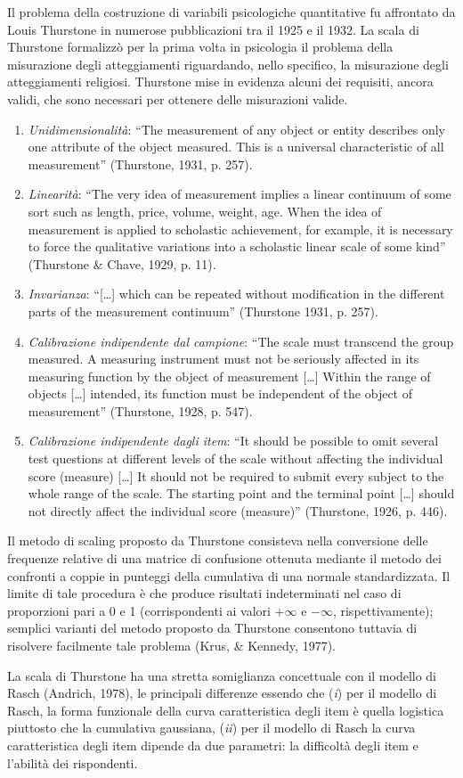 Il problema della costruzione di variabili psicologiche quantitative fu affrontato da Louis Thurstone in numerose pubblicazioni tra il 1925 e il 1932. La scala di Thurstone formalizzò per la prima volta in psicologia il problema della misurazione degli atteggiamenti riguardando, nello specifico, la misurazione degli atteggiamenti religiosi. Thurstone mise in evidenza alcuni dei requisiti, ancora validi, che sono necessari per ottenere delle misurazioni valide.
\begin{enumerate}
 \item \emph{Unidimensionalità}: ``The measurement of any object or entity describes only one attribute of the object measured. This is a universal characteristic of all measurement'' (Thurstone, 1931, p. 257). 
 \item \emph{Linearità}: ``The very idea of measurement implies a linear continuum of some sort such as length, price, volume, weight, age. When the idea of measurement is applied to scholastic achievement, for example, it is necessary to force the qualitative variations into a scholastic linear scale of some kind'' (Thurstone \& Chave, 1929, p. 11). 
 \item \emph{Invarianza}:  ``[\dots] which can be repeated without modification in the different parts of the measurement continuum'' (Thurstone 1931, p. 257).
 \item \emph{Calibrazione indipendente dal campione}: ``The scale must transcend the group measured. A measuring instrument must not be seriously affected in its measuring function by the object of measurement [\dots] Within the range of objects [\dots] intended, its function must be independent of the object of measurement'' (Thurstone, 1928, p. 547).
 \item \emph{Calibrazione indipendente dagli item}: ``It should be possible to omit several test questions at different levels of the scale without affecting the individual score (measure) [\dots] It should not be required to submit every subject to the whole range of the scale. The starting point and the terminal point [\dots] should not directly affect the individual score (measure)'' (Thurstone, 1926, p. 446).
 \end{enumerate}

Il metodo di scaling proposto da Thurstone consisteva nella conversione delle frequenze relative di una matrice di confusione ottenuta mediante il metodo dei confronti a coppie in punteggi della cumulativa di una normale standardizzata. Il limite di tale procedura è che produce risultati indeterminati nel caso di proporzioni pari a 0 e 1 (corrispondenti ai valori $+\infty$ e $-\infty$, rispettivamente); semplici varianti del metodo proposto da Thurstone consentono tuttavia di risolvere facilmente tale problema (Krus, \& Kennedy, 1977).  

La scala di Thurstone ha una stretta somiglianza concettuale con il modello di Rasch (Andrich, 1978), le principali differenze essendo  che (\emph{i}) per il modello di Rasch,  la forma funzionale della curva caratteristica degli item è quella  logistica piuttosto che la cumulativa  gaussiana, (\emph{ii}) per il modello di Rasch la curva caratteristica degli item dipende da due parametri: la difficoltà degli item e l'abilità dei rispondenti.

